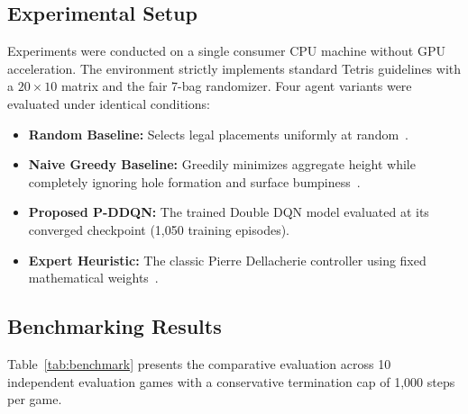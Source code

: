 \documentclass[runningheads]{llncs}
\begin{document}
\subsection{Experimental Setup}
Experiments were conducted on a single consumer CPU machine without GPU acceleration. The environment strictly implements standard Tetris guidelines with a $20 \times 10$ matrix and the fair 7-bag randomizer. Four agent variants were evaluated under identical conditions:
\begin{itemize}
    \item \textbf{Random Baseline:} Selects legal placements uniformly at random~\cite{demaine2002tetris}.
    \item \textbf{Naive Greedy Baseline:} Greedily minimizes aggregate height while completely ignoring hole formation and surface bumpiness~\cite{fahey2003tetris}.
    \item \textbf{Proposed P-DDQN:} The trained Double DQN model evaluated at its converged checkpoint (1,050 training episodes).
    \item \textbf{Expert Heuristic:} The classic Pierre Dellacherie controller using fixed mathematical weights~\cite{fahey2003tetris}.
\end{itemize}

\subsection{Benchmarking Results}
Table~\ref{tab:benchmark} presents the comparative evaluation across 10 independent evaluation games with a conservative termination cap of 1,000 steps per game.

\begin{table}[htbp]
\caption{Empirical performance comparison across 10 independent test games under a 1,000-step execution ceiling.}\label{tab:benchmark}
\centering
{}
\end{table}
\end{document}

